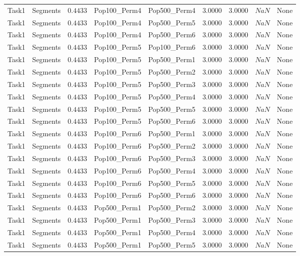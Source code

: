 \documentclass[8pt]{article}
\begin{document}
\begin{longtable}{llccccccc}
Task1 & Segments & $0.4433$ & Pop100\_Perm4 & Pop500\_Perm4 & 3.0000 & 3.0000 & $NaN$ & None \\
Task1 & Segments & $0.4433$ & Pop100\_Perm4 & Pop500\_Perm5 & 3.0000 & 3.0000 & $NaN$ & None \\
Task1 & Segments & $0.4433$ & Pop100\_Perm4 & Pop500\_Perm6 & 3.0000 & 3.0000 & $NaN$ & None \\
Task1 & Segments & $0.4433$ & Pop100\_Perm5 & Pop100\_Perm6 & 3.0000 & 3.0000 & $NaN$ & None \\
Task1 & Segments & $0.4433$ & Pop100\_Perm5 & Pop500\_Perm1 & 3.0000 & 3.0000 & $NaN$ & None \\
Task1 & Segments & $0.4433$ & Pop100\_Perm5 & Pop500\_Perm2 & 3.0000 & 3.0000 & $NaN$ & None \\
Task1 & Segments & $0.4433$ & Pop100\_Perm5 & Pop500\_Perm3 & 3.0000 & 3.0000 & $NaN$ & None \\
Task1 & Segments & $0.4433$ & Pop100\_Perm5 & Pop500\_Perm4 & 3.0000 & 3.0000 & $NaN$ & None \\
Task1 & Segments & $0.4433$ & Pop100\_Perm5 & Pop500\_Perm5 & 3.0000 & 3.0000 & $NaN$ & None \\
Task1 & Segments & $0.4433$ & Pop100\_Perm5 & Pop500\_Perm6 & 3.0000 & 3.0000 & $NaN$ & None \\
Task1 & Segments & $0.4433$ & Pop100\_Perm6 & Pop500\_Perm1 & 3.0000 & 3.0000 & $NaN$ & None \\
Task1 & Segments & $0.4433$ & Pop100\_Perm6 & Pop500\_Perm2 & 3.0000 & 3.0000 & $NaN$ & None \\
Task1 & Segments & $0.4433$ & Pop100\_Perm6 & Pop500\_Perm3 & 3.0000 & 3.0000 & $NaN$ & None \\
Task1 & Segments & $0.4433$ & Pop100\_Perm6 & Pop500\_Perm4 & 3.0000 & 3.0000 & $NaN$ & None \\
Task1 & Segments & $0.4433$ & Pop100\_Perm6 & Pop500\_Perm5 & 3.0000 & 3.0000 & $NaN$ & None \\
Task1 & Segments & $0.4433$ & Pop100\_Perm6 & Pop500\_Perm6 & 3.0000 & 3.0000 & $NaN$ & None \\
Task1 & Segments & $0.4433$ & Pop500\_Perm1 & Pop500\_Perm2 & 3.0000 & 3.0000 & $NaN$ & None \\
Task1 & Segments & $0.4433$ & Pop500\_Perm1 & Pop500\_Perm3 & 3.0000 & 3.0000 & $NaN$ & None \\
Task1 & Segments & $0.4433$ & Pop500\_Perm1 & Pop500\_Perm4 & 3.0000 & 3.0000 & $NaN$ & None \\
Task1 & Segments & $0.4433$ & Pop500\_Perm1 & Pop500\_Perm5 & 3.0000 & 3.0000 & $NaN$ & None \\

\end{longtable}
\end{document}
